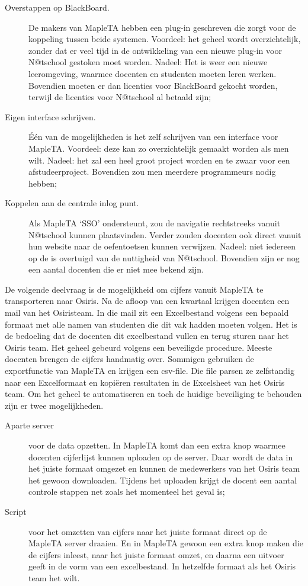 \begin{description}
\item[Overstappen op BlackBoard.] De makers van MapleTA hebben een
  plug-in geschreven die zorgt voor de koppeling tussen beide
  systemen. Voordeel: het geheel wordt overzichtelijk, zonder dat er
  veel tijd in de ontwikkeling van een nieuwe plug-in voor N@tschool
  gestoken moet worden. Nadeel: Het is weer een nieuwe leeromgeving,
  waarmee docenten en studenten moeten leren werken. Bovendien moeten
  er dan licenties voor BlackBoard gekocht worden, terwijl de
  licenties voor N@tschool al betaald zijn;
\item[Eigen interface schrijven.] Één van de mogelijkheden is het zelf
  schrijven van een interface voor MapleTA. Voordeel: deze kan zo
  overzichtelijk gemaakt worden als men wilt. Nadeel: het zal een heel
  groot project worden en te zwaar voor een
  afstudeerproject. Bovendien zou men meerdere programmeurs nodig
  hebben;
\item[Koppelen aan de centrale inlog punt.] Als MapleTA `SSO'
  ondersteunt, zou de navigatie rechtstreeks vanuit N@tschool kunnen
  plaatsvinden. Verder zouden docenten ook direct vanuit hun website
  naar de oefentoetsen kunnen verwijzen. Nadeel: niet iedereen op de
  \HR{} is overtuigd van de nuttigheid van N@tschool. Bovendien zijn
  er nog een aantal docenten die er niet mee bekend zijn.
\end{description}


De volgende deelvraag is de mogelijkheid om cijfers vanuit MapleTA te
transporteren naar Osiris. Na de afloop van een kwartaal krijgen
docenten een mail van het Osiristeam. In die mail zit een Excelbestand
volgens een bepaald formaat met alle namen van studenten die dit vak
hadden moeten volgen. Het is de bedoeling dat de docenten dit
excelbestand vullen en terug sturen naar het Osiris team. Het geheel
gebeurd volgens een beveiligde procedure. Meeste docenten brengen de
cijfers handmatig over. Sommigen gebruiken de exportfunctie van
MapleTA en krijgen een csv-file. Die file parsen ze zelfstandig naar
een Excelformaat en kopiëren resultaten in de Excelsheet van het
Osiris team. Om het geheel te automatiseren en toch de huidige
beveiliging te behouden zijn er twee mogelijkheden.

\begin{description}
\item[Aparte server] voor de data opzetten. In MapleTA komt dan een
  extra knop waarmee docenten cijferlijst kunnen uploaden op de
  server. Daar wordt de data in het juiste formaat omgezet en kunnen
  de medewerkers van het Osiris team het gewoon downloaden. Tijdens
  het uploaden krijgt de docent een aantal controle stappen net zoals
  het momenteel het geval is;
\item[Script] voor het omzetten van cijfers naar het juiste formaat
  direct op de MapleTA server draaien. En in MapleTA gewoon een extra
  knop maken die de cijfers inleest, naar het juiste formaat omzet, en
  daarna een uitvoer geeft in de vorm van een excelbestand. In
  hetzelfde formaat als het Osiris team het wilt.
\end{description}

